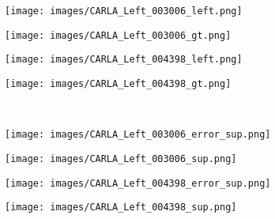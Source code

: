 \documentclass[10pt,twocolumn,letterpaper]{article}
\begin{document}
\begin{figure}[tbp]
	\captionsetup[subfigure]{labelformat=empty}
	\centering
	\begin{minipage}[c]{0.985\linewidth}
		\begin{subfigure}[c]{.239\linewidth}
			\texttt{[image: images/CARLA\_Left\_003006\_left.png]}
			\vspace*{-0.38cm}
		\end{subfigure}
		\begin{subfigure}[c]{.239\linewidth}
			\texttt{[image: images/CARLA\_Left\_003006\_gt.png]}
			\vspace*{-0.38cm}
		\end{subfigure}
		\begin{subfigure}[c]{.239\linewidth}
			\texttt{[image: images/CARLA\_Left\_004398\_left.png]}
			\vspace*{-0.38cm}
		\end{subfigure}
		\begin{subfigure}[c]{.239\linewidth}
			\texttt{[image: images/CARLA\_Left\_004398\_gt.png]}
			\vspace*{-0.38cm}
		\end{subfigure}
	\end{minipage}
	\\\begin{minipage}[c]{0.985\linewidth}
		\begin{subfigure}[c]{.239\linewidth}
			\texttt{[image: images/CARLA\_Left\_003006\_error\_sup.png]}
			\vspace*{-0.38cm}		
		\end{subfigure}
		\begin{subfigure}[c]{.239\linewidth}
			\texttt{[image: images/CARLA\_Left\_003006\_sup.png]}
			\vspace*{-0.38cm}
		\end{subfigure}
		\begin{subfigure}[c]{.239\linewidth}
			\texttt{[image: images/CARLA\_Left\_004398\_error\_sup.png]}
			\vspace*{-0.38cm}		
		\end{subfigure}
		\begin{subfigure}[c]{.239\linewidth}
			\texttt{[image: images/CARLA\_Left\_004398\_sup.png]}
			\vspace*{-0.38cm}
		\end{subfigure}
	\end{minipage}

\end{figure}
\end{document}

